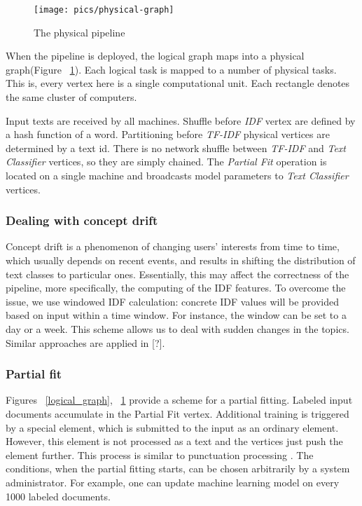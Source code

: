 \begin{figure}[htbp]
  \centering
  \texttt{[image: pics/physical-graph]}
  \caption{The physical pipeline}
  \label {physical_graph}
\end{figure}

When the pipeline is deployed, the logical graph maps into a physical graph(Figure ~\ref{physical_graph}). Each logical task is mapped to a number of physical tasks. This is, every vertex here is a single computational unit. Each rectangle denotes the same cluster of computers.

Input texts are received by all machines. Shuffle before {\em IDF} vertex are defined by a hash function of a word. Partitioning before {\em TF-IDF} physical vertices are determined by a text id. There is no network shuffle between {\em TF-IDF} and {\em Text Classifier} vertices, so they are simply chained. The {\em Partial Fit} operation is located on a single machine and broadcasts model parameters to {\em Text Classifier} vertices.

\subsubsection{Dealing with concept drift}

Concept drift is a phenomenon of changing users' interests from time to time, which usually depends on recent events, and results in shifting the distribution of text classes to particular ones. Essentially, this may affect the correctness of the pipeline, more specifically, the computing of the IDF features. To overcome the issue, we use windowed IDF calculation: concrete IDF values will be provided based on input within a time window. For instance, the window can be set to a day or a week. This scheme allows us to deal with sudden changes in the topics. Similar approaches are applied in [?].

\subsubsection{Partial fit}

Figures ~\ref{logical_graph}, ~\ref{physical_graph} provide a scheme for a partial fitting. Labeled input documents accumulate in the Partial Fit vertex. Additional training is triggered by a special element, which is submitted to the input as an ordinary element. However, this element is not processed as a text and the vertices just push the element further. This process is similar to punctuation processing \cite{tucker2003exploiting}. The conditions, when the partial fitting starts, can be chosen arbitrarily by a system administrator. For example, one can update machine learning model on every 1000 labeled documents.

